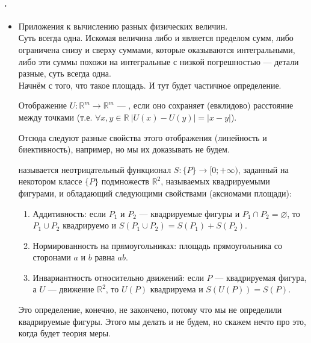 \documentclass{article}
\begin{document}
    \paragraph{.}
    \begin{itemize}
        \item[]
        \begin{Comment}
            Приложения к вычислению разных физических величин.\\
            Суть всегда одна. Искомая величина либо и является пределом сумм, либо ограничена снизу и сверху суммами, которые оказываются интегральными, либо эти суммы похожи на интегральные с низкой погрешностью --- детали разные, суть всегда одна.\\
            Начнём с того, что такое площадь. И тут будет частичное определение.
        \end{Comment}
        \dfn Отображение $U\colon\mathbb R^m\to\mathbb R^m$ --- , если оно сохраняет (евклидово) расстояние между точками (т.е. $\forall x,y\in\mathbb R~|U(x)-U(y)|=|x-y|$).
        \begin{Comment}
            Отсюда следуют разные свойства этого отображения (линейность и биективность), например, но мы их доказывать не будем.
        \end{Comment}
        \dfn {} называется неотрицательный функционал $S\colon\{P\}\to[0;+\infty)$, заданный на некотором классе $\{P\}$ подмножеств $\mathbb R^2$, называемых квадрируемыми фигурами, и обладающий следующими свойствами (аксиомами площади):
        \begin{enumerate}
            \item Аддитивность: если $P_1$ и $P_2$ --- квадрируемые фигуры и $P_1\cap P_2=\varnothing$, то $P_1\cup P_2$ квадрируемо и $S(P_1\cup P_2)=S(P_1)+S(P_2)$.
            \item Нормированность на прямоугольниках: площадь прямоугольника со сторонами $a$ и $b$ равна $ab$.
            \item Инвариантность относительно движений: если $P$ --- квадрируемая фигура, а $U$ --- движение $\mathbb R^2$, то $U(P)$ квадрируема и $S(U(P))=S(P)$.
        \end{enumerate}
        \begin{Comment}
            Это определение, конечно, не закончено, потому что мы не определили квадрируемые фигуры. Этого мы делать и не будем, но скажем нечто про это, когда будет теория меры.\\

\end{Comment}
\end{itemize}
\end{document}
